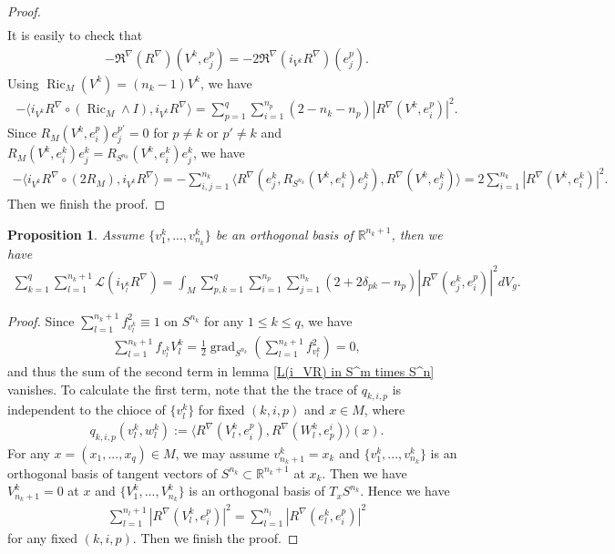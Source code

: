 \documentclass{amsart}
\newtheorem{proposition}{Proposition}[section]
\begin{document}
\begin{proof}
\begin{align*}
		\end{align*}
		It is easily to check that
		\begin{align*}
			-\mathfrak{R}^\nabla(R^\nabla)(V^k,e_j^p)=-2\mathfrak{R}^\nabla(i_{V^k}R^\nabla)(e_j^p).
		\end{align*}
		Using $\operatorname{Ric}_M(V^k)=(n_k-1)V^k$, we have
		\begin{align*}
			-\langle i_{V^k}R^\nabla\circ(\operatorname{Ric}_M\wedge I),i_{V^k}R^\nabla\rangle=\sum_{p=1}^q\sum_{i=1}^{n_p}(2-n_k-n_p)|R^\nabla(V^k,e_i^p)|^2.
		\end{align*}
		Since $R_M(V^k,e_i^p)e_j^{p'}=0$ for $p\ne k$ or $p'\ne k$ and $R_M(V^k,e_i^k)e_j^k=R_{S^{n_k}}(V^k,e_i^k)e_j^k$, we have
		\begin{align*}
			-\langle i_{V^k}R^\nabla\circ(2R_M),i_{V^k}R^\nabla\rangle=-\sum_{i,j=1}^{n_k}\langle R^\nabla(e_j^k,R_{S^{n_k}}(V^k,e_i^k)e_j^k),R^\nabla(V^k,e_j^k)\rangle=2\sum_{i=1}^{n_k}|R^\nabla(V^k,e_i^k)|^2.
		\end{align*}
		Then we finish the proof.
	\end{proof}
	\begin{proposition}
		Assume $\{v_1^k,...,v_{n_k}^k\}$ be an orthogonal basis of $\mathbb{R}^{n_k+1}$, then we have
		\begin{align*}
			\sum_{k=1}^q\sum_{l=1}^{n_k+1}\mathscr{L}(i_{V_l^k}R^\nabla)=\int_M\sum_{p,k=1}^q\sum_{i=1}^{n_p}\sum_{j=1}^{n_k}(2+2\delta_{pk}-n_p)|R^\nabla(e_j^k,e_i^p)|^2dV_g.
		\end{align*}
	\end{proposition}
	\begin{proof}
		Since $\sum_{l=1}^{n_k+1}f_{v^k_l}^2\equiv1$ on $S^{n_k}$ for any $1\le k\le q$, we have
		\begin{align*}             \sum_{l=1}^{n_k+1}f_{v^k_l}V^k_l=\frac12\operatorname{grad}_{S^{n_k}}(\sum_{l=1}^{n_k+1}f_{v^k_l}^2)=0,
		\end{align*}
		and thus the sum of the second term in lemma \ref{L(i_VR) in S^m times S^n} vanishes. To calculate the first term, note that the the trace of $q_{k,i,p}$ is independent to the chioce of $\{v^k_l\}$ for fixed $(k,i,p)$ and $x\in M$, where
		\begin{align*}
			q_{k,i,p}(v^k_l,w^k_l):=\langle R^\nabla(V^k_l,e_i^p),R^\nabla(W^k_l,e^i_p)\rangle(x).
		\end{align*}
		For any $x=(x_1,...,x_q)\in M$, we may assume $v^k_{n_k+1}=x_k$ and $\{v^k_1,...,v^k_{n_k}\}$ is an orthogonal basis of tangent vectors of $S^{n_k}\subset\mathbb{R}^{n_k+1}$ at $x_k$. Then we have $V^k_{n_k+1}=0$ at $x$ and $\{V_1^k,...,V^k_{n_k}\}$ is an orthogonal basis of $T_xS^{n_k}$. Hence we have
		\begin{align*}
			\sum_{l=1}^{n_l+1}|R^\nabla(V^k_l,e_i^p)|^2=\sum_{l=1}^{n_l}|R^\nabla(e^k_l,e_i^p)|^2
		\end{align*}
		for any fixed $(k,i,p)$. Then we finish the proof.
	\end{proof}
\end{document}
